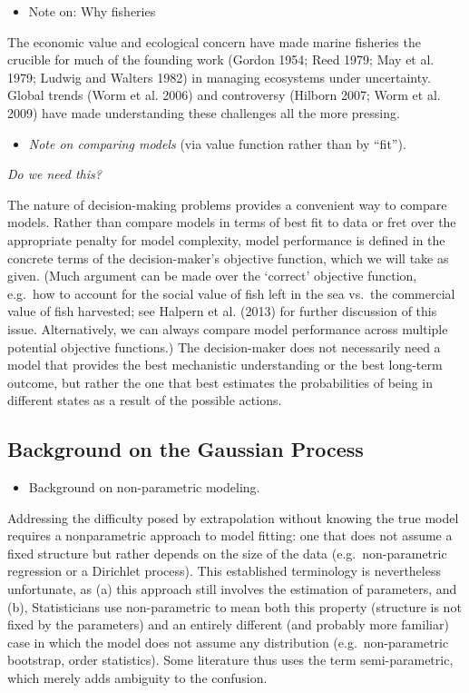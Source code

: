 \documentclass[author-year, review]{elsarticle} %
\begin{document}
\begin{itemize}
\itemsep1pt\parskip0pt
\item
  Note on: Why fisheries
\end{itemize}

The economic value and ecological concern have made marine fisheries the
crucible for much of the founding work (Gordon 1954; Reed 1979; May et
al. 1979; Ludwig and Walters 1982) in managing ecosystems under
uncertainty. Global trends (Worm et al. 2006) and controversy (Hilborn
2007; Worm et al. 2009) have made understanding these challenges all the
more pressing.

\begin{itemize}
\itemsep1pt\parskip0pt
\item
  \emph{Note on comparing models} (via value function rather than by
  ``fit'').
\end{itemize}

\emph{Do we need this?}

The nature of decision-making problems provides a convenient way to
compare models. Rather than compare models in terms of best fit to data
or fret over the appropriate penalty for model complexity, model
performance is defined in the concrete terms of the decision-maker's
objective function, which we will take as given. (Much argument can be
made over the `correct' objective function, e.g.~how to account for the
social value of fish left in the sea vs.~the commercial value of fish
harvested; see Halpern et al. (2013) for further discussion of this
issue. Alternatively, we can always compare model performance across
multiple potential objective functions.) The decision-maker does not
necessarily need a model that provides the best mechanistic
understanding or the best long-term outcome, but rather the one that
best estimates the probabilities of being in different states as a
result of the possible actions.

\subsection{Background on the Gaussian
Process}\label{background-on-the-gaussian-process}

\begin{itemize}
\itemsep1pt\parskip0pt
\item
  Background on non-parametric modeling.
\end{itemize}

Addressing the difficulty posed by extrapolation without knowing the
true model requires a nonparametric approach to model fitting: one that
does not assume a fixed structure but rather depends on the size of the
data (e.g.~non-parametric regression or a Dirichlet process). This
established terminology is nevertheless unfortunate, as (a) this
approach still involves the estimation of parameters, and (b),
Statisticians use non-parametric to mean both this property (structure
is not fixed by the parameters) and an entirely different (and probably
more familiar) case in which the model does not assume any distribution
(e.g.~non-parametric bootstrap, order statistics). Some literature thus
uses the term semi-parametric, which merely adds ambiguity to the
confusion.
\end{document}
